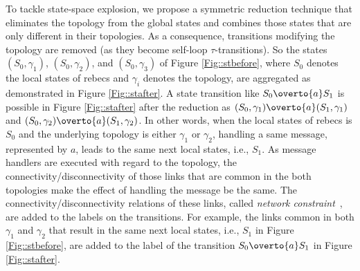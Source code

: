 To tackle state-space explosion, we propose a symmetric reduction technique that eliminates the topology from the global states and combines those states that are only different in their topologies. As a consequence, transitions modifying the topology are removed (as they become self-loop $\tau$-transitions). So the states $(S_0,\gamma_1)$, $(S_0,\gamma_2)$, and $(S_0,\gamma_3)$ of Figure \ref{Fig::stbefore}, 
where $S_0$ denotes the local states of rebecs and $\gamma_i$ denotes the  topology, are aggregated as demonstrated in Figure \ref{Fig::stafter}. %
A state transition like $S_0\overto{a} S_1$ is possible in Figure \ref{Fig::stafter} after the reduction as $(S_0,\gamma_1)\overto{a}(S_1,\gamma_1)$ and $(S_0,\gamma_2)\overto{a}(S_1,\gamma_2)$. In other words, when the local states of rebecs is $S_0$ and the underlying topology is either $\gamma_1$ or $\gamma_2$, handling a same message, represented by $a$, leads to the same next local states, i.e., $S_1$.  As message handlers are executed with regard to the topology, the connectivity/disconnectivity of those links that are common in the both topologies make the effect of handling the message be the same. %
The connectivity/disconnectivity relations of these links, called \emph{network constraint}~\cite{FatemehFI10,FatemehFI19},  
are added to the labels on the transitions. For example, %
the links common in both $\gamma_{1}$ and $\gamma_{2}$ that result in the same next local states, i.e., $S_1$ in Figure \ref{Fig::stbefore}, are added to the label of the transition $S_0\overto{a}S_1$ in Figure \ref{Fig::stafter}. 
%
